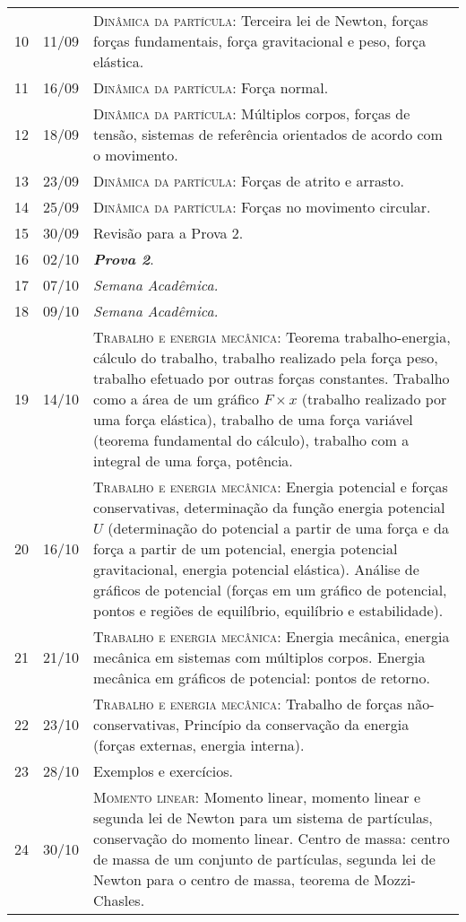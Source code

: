 \begin{center}
\begin{longtable}{ccp{70mm}}
10	 & 	11/09	 & 	\textsc{Dinâmica da partícula:} Terceira lei de Newton, forças forças fundamentais, força gravitacional e peso, força elástica. \\
11	 & 	16/09	 & 	\textsc{Dinâmica da partícula:} Força normal. \\
12	 & 	18/09	 & 	\textsc{Dinâmica da partícula:} Múltiplos corpos, forças de tensão, sistemas de referência orientados de acordo com o movimento. \\
13	 & 	23/09	 & 	\textsc{Dinâmica da partícula:} Forças de atrito e arrasto. \\
14	 & 	25/09	 & 	\textsc{Dinâmica da partícula:} Forças no movimento circular. \\
15	 & 	30/09	 & 	Revisão para a Prova 2. \\
16	 & 	02/10	 &  	\textbf{\textit{Prova 2}}. \\
17	 & 	07/10 	 & 	\textit{Semana Acadêmica.} \\
18	 & 	09/10 	 & 	\textit{Semana Acadêmica.} \\
19	 & 	14/10	 & 	\textsc{Trabalho e energia mecânica:} Teorema trabalho-energia, cálculo do trabalho, trabalho realizado pela força peso, trabalho efetuado por outras forças constantes. Trabalho como a área de um gráfico $F \times x$ (trabalho realizado por uma força elástica), trabalho de uma força variável (teorema fundamental do cálculo), trabalho com a integral de uma força, potência. \\
20	 & 	16/10	 & 	\textsc{Trabalho e energia mecânica:} Energia potencial e forças conservativas, determinação da função energia potencial $U$ (determinação do potencial a partir de uma força e da força a partir de um potencial, energia potencial gravitacional, energia potencial elástica). Análise de gráficos de potencial (forças em um gráfico de potencial, pontos e regiões de equilíbrio, equilíbrio e estabilidade). \\
21	 & 	21/10	 & 	\textsc{Trabalho e energia mecânica:} Energia mecânica, energia mecânica em sistemas com múltiplos corpos. Energia mecânica em gráficos de potencial: pontos de retorno. \\
22	 & 	23/10	 & 	\textsc{Trabalho e energia mecânica:} Trabalho de forças não-conservativas, Princípio da conservação da energia (forças externas, energia interna). \\
23	 & 	28/10	 & 	Exemplos e exercícios. \\
24	 & 	30/10	 & 	\textsc{Momento linear:} Momento linear, momento linear e segunda lei de Newton para um sistema de partículas, conservação do momento linear. Centro de massa: centro de massa de um conjunto de partículas, segunda lei de Newton para o centro de massa, teorema de Mozzi-Chasles. \\

\end{longtable}
\end{center}
